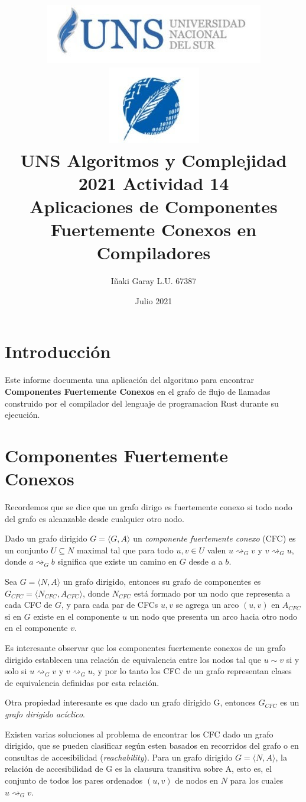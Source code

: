 \documentclass[11pt, a4paper]{article}
\title{
    \includegraphics[height=0.2\textwidth]{uns-logo}
    \includegraphics[height=0.2\textwidth]{dcic-logo} \\
    UNS Algoritmos y Complejidad 2021 Actividad 14 \\
    \large{Aplicaciones de Componentes Fuertemente Conexos en Compiladores}
    }
\author{Iñaki Garay L.U. 67387}
\date{Julio 2021}
\begin{document}
\maketitle


\section{Introducción}

Este informe documenta una aplicación del algoritmo para encontrar \textbf{Componentes Fuertemente Conexos} en el grafo de flujo de llamadas construido por el compilador del lenguaje de programacion Rust durante su ejecución.

\section{Componentes Fuertemente Conexos}

Recordemos que se dice que un grafo dirigo es fuertemente conexo si todo nodo del grafo es alcanzable desde cualquier otro nodo.

Dado un grafo dirigido $G = \langle G, A \rangle$ un \textit{componente fuertemente conexo} (CFC) es un conjunto $U \subseteq N$ maximal tal que para todo $u, v \in U$ valen $u \rightsquigarrow_{G} v$ y $v \rightsquigarrow_{G} u$, donde $a \rightsquigarrow_{G} b$ significa que existe un camino en $G$ desde $a$ a $b$.

Sea $G = \langle N,A \rangle$ un grafo dirigido, entonces su grafo de componentes es $G_{CFC} = \langle N_{CFC}, A_{CFC} \rangle$, donde $N_{CFC}$ está formado por un nodo que representa a cada CFC de $G$, y para cada par de CFCs $u, v$ se agrega un arco $(u,v)$ en $A_{CFC}$ si en $G$ existe en el componente $u$ un nodo que presenta un arco hacia otro nodo en el componente $v$.

Es interesante observar que los componentes fuertemente conexos de un grafo dirigido establecen una relación de equivalencia entre los nodos tal que $u \sim v$ si y solo si $u \rightsquigarrow_{G} v$ y $v \rightsquigarrow_{G} u$, y por lo tanto los CFC de un grafo representan clases de equivalencia definidas por esta relación.

Otra propiedad interesante es que dado un grafo dirigido G, entonces $G_{CFC}$ es un \textit{grafo dirigido acíclico}.

Existen varias soluciones al problema de encontrar los CFC dado un grafo dirigido, que se pueden clasificar según esten basados en recorridos del grafo o en consultas de accesibilidad (\textit{reachability}).
Para un grafo dirigido $G = \langle N, A \rangle$, la relación de accesibilidad de G es la clausura transitiva sobre A, esto es, el conjunto de todos los pares ordenados $(u, v)$ de nodos en $N$ para los cuales $u \rightsquigarrow_{G} v$.
\end{document}
